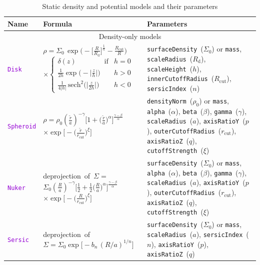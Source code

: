 \documentclass[12pt]{article}
\newcommand{\ttt}[1]{\textcolor{darkviolet}{\texttt{#1}}}
\newcommand{\ppp}[1]{\textcolor{darkolive} {\texttt{#1}}}
\begin{document}
\begin{table}
\caption{Static density and potential models and their parameters}  \label{tab:PotentialParams}
\hspace{-2mm}\begin{tabular}{l m{50mm} >{\raggedright\arraybackslash}m{80mm}}
Name & Formula & Parameters \\
\hline
\multicolumn{3}{c}{Density-only models} \\

\ttt{Disk} & $\rho = \Sigma_0\,\exp\big(-\big[\frac{R}{R_\mathrm{d}}\big]^{\frac1n} - \frac{R_\mathrm{cut}}{R}\big)$
$\times\left\{ \begin{array}{ll} \delta(z)\qquad\qquad\mbox{if} & h=0 \\[1mm]
\frac{1}{2h} \exp\big(-\big|\frac{z}{h}\big|\big) & h>0 \\[1mm]
\frac{1}{4|h|}\, \mathrm{sech}^2\big(\big|\frac{z}{2h}\big|\big) & h<0 \end{array} \right. $ &
\ppp{surfaceDensity}~($\Sigma_0$) or \ppp{mass}, \ppp{scaleRadius}~($R_\mathrm{d}$), \ppp{scaleHeight}~($h$), \ppp{innerCutoffRadius}~($R_\mathrm{cut}$), \ppp{sersicIndex}~($n$)\\

\ttt{Spheroid} & $\rho = \rho_0  \left(\frac{\tilde r}{a}\right)^{-\gamma} \Big[ 1 + \big(\frac{\tilde r}{a}\big)^\alpha \Big]^{\frac{\gamma-\beta}{\alpha}}$ $\times \exp\Big[ -\big(\frac{\tilde r}{r_\mathrm{cut}}\big)^\xi\Big] $ &
\ppp{densityNorm}~($\rho_0$) or \ppp{mass}, \ppp{alpha}~($\alpha$), \ppp{beta}~($\beta$), \ppp{gamma}~($\gamma$), \ppp{scaleRadius}~($a$), \ppp{axisRatioY}~($p$), \ppp{outerCutoffRadius}~($r_\mathrm{cut}$), \ppp{axisRatioZ}~($q$), \ppp{cutoffStrength}~($\xi$) \\[10mm]

\ttt{Nuker} & \mbox{deprojection of $\Sigma={}$} \mbox{$\Sigma_0 \left(\frac{R}{a}\right)^{-\gamma} \Big[ \frac12 + \frac12\big(\frac{R}{a}\big)^\alpha \Big]^{\frac{\gamma-\beta}{\alpha}}$} $\times \exp\Big[ -\big(\frac{R}{r_\mathrm{cut}}\big)^\xi\Big] $  & \ppp{surfaceDensity}~($\Sigma_0$) or \ppp{mass}, \ppp{alpha}~($\alpha$), \ppp{beta}~($\beta$), \ppp{gamma}~($\gamma$), \ppp{scaleRadius}~($a$), \ppp{axisRatioY}~($p$), \ppp{outerCutoffRadius}~($r_\mathrm{cut}$), \ppp{axisRatioZ}~($q$), \ppp{cutoffStrength}~($\xi$) \\[2mm]

\ttt{Sersic} & \mbox{deprojection of} \mbox{$\Sigma = \Sigma_0 \exp\big[-b_n\,(R/a)^{1/n}\big]$} & \ppp{surfaceDensity}~($\Sigma_0$) or \ppp{mass}, \ppp{scaleRadius}~($a$), \ppp{sersicIndex}~($n$), \ppp{axisRatioY}~($p$), \ppp{axisRatioZ}~($q$) \\[2mm]


\end{tabular}
\end{table}
\end{document}
